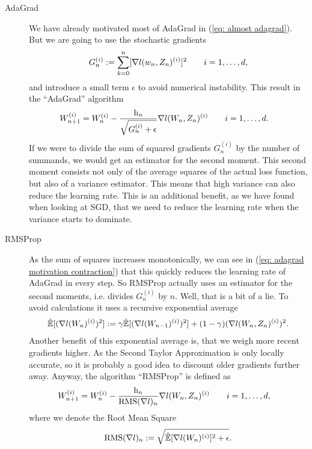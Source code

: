 \begin{description}
	\item[AdaGrad] \parencite{duchiAdaptiveSubgradientMethods2011}
	We have already motivated most of AdaGrad in (\ref{eq: almost adagrad}).
	But we are going to use the stochastic gradients
	\begin{align*}
		G_n^{(i)} := \sum_{k=0}^n [\nabla l(w_n, Z_n)^{(i)}]^2 \qquad i=1,\dots,d,
	\end{align*}
	and introduce a small term \(\epsilon\) \parencite[\(\approx 10^{-8}\)][]{ruderOverviewGradientDescent2017}
	to avoid numerical instability. This result in the ``AdaGrad'' algorithm
	\begin{align*}
		W_{n+1}^{(i)}
		&= W_n^{(i)}
		- \frac{\text{h}_n}{\sqrt{G_n^{(i)}+\epsilon}}\nabla l(W_n, Z_n)^{(i)}
		\qquad i=1,\dots,d.
	\end{align*}
	If we were to divide the sum of squared gradients \(G_n^{(i)}\) by the number
	of summands, we would get an estimator for the second moment. This second
	moment consists not only of the average squares of the actual loss function,
	but also of a variance estimator. This means that high variance can also
	reduce the learning rate. This is an additional benefit, as we have found
	when looking at SGD, that we need to reduce the learning rate when the
	variance starts to dominate.

	\item[RMSProp]\parencite[lecture 6e]{hintonNeuralNetworksMachine2012} As the sum of squares increases monotonically, we can see 
	in (\ref{eq: adagrad motivation contraction}) that this quickly reduces
	the learning rate of AdaGrad in every step. So RMSProp actually uses an
	estimator for the second moments, i.e. divides \(G_n^{(i)}\) by \(n\). Well,
	that is a bit of a lie. To avoid calculations it uses a recursive exponential
	average
	\begin{align*}
		\hat{\mathbb{E}}[(\nabla l(W_n)^{(i)})^2]
		:= \gamma \hat{\mathbb{E}}[(\nabla l(W_{n-1})^{(i)})^2]
		+ (1-\gamma)(\nabla l(W_n, Z_n)^{(i)})^2.
	\end{align*}
	Another benefit of this exponential average is, that we weigh more recent
	gradients higher. As the Second Taylor Approximation is only locally
	accurate, so it is probably a good idea to discount older gradients further
	away. Anyway, the algorithm ``RMSProp'' is defined as
	\begin{align*}
		W_{n+1}^{(i)}
		&= W_n^{(i)}
		- \frac{\text{h}_n}{\text{RMS}(\nabla l)_n}\nabla l(W_n, Z_n)^{(i)}
		\qquad i=1,\dots,d,
	\end{align*}
	where we denote the Root Mean Square
	\begin{align*}
		\text{RMS}(\nabla l)_n := \sqrt{\hat{\mathbb{E}}[\nabla l(W_n)^{(i)}]^2+\epsilon}.
	\end{align*}


\end{description}
